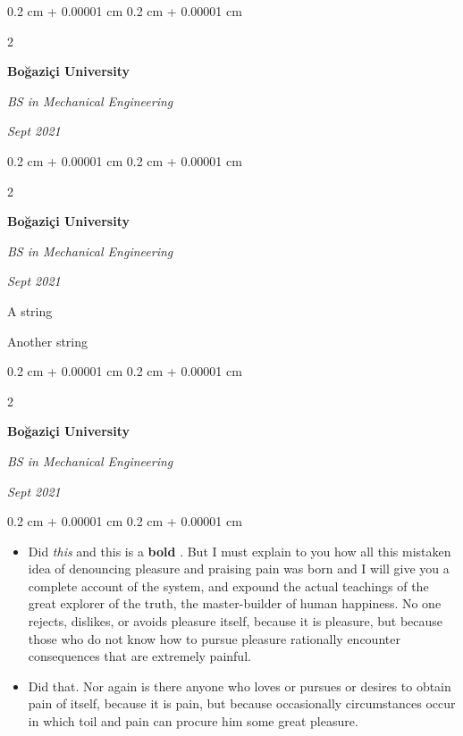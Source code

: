 \documentclass[10pt, letterpaper]{article}
\newenvironment{summary}{
    \begin{description}[
        topsep=0.10 cm,
        parsep=0.10 cm,
        partopsep=0pt,
        itemsep=0pt,
        leftmargin=0.4 cm + 10pt
    ]
}{
    \end{description}
} %
\newenvironment{highlights}{
    \begin{itemize}[
        topsep=0.10 cm,
        parsep=0.10 cm,
        partopsep=0pt,
        itemsep=0pt,
        leftmargin=0.4 cm + 10pt
    ]
}{
    \end{itemize}
} %
\newenvironment{onecolentry}{
    \begin{adjustwidth}{
        0.2 cm + 0.00001 cm
    }{
        0.2 cm + 0.00001 cm
    }
}{
    \end{adjustwidth}
} %
\newenvironment{twocolentry}[2][]{
    \onecolentry
    \def\secondColumn{#2}
    \setcolumnwidth{\fill, 4.5 cm}
    \begin{paracol}{2}
}{
    \switchcolumn \raggedleft \secondColumn
    \end{paracol}
    \endonecolentry
} %
\let\hrefWithoutArrow\href
\renewcommand{\href}[2]{\hrefWithoutArrow{#1}{\ifthenelse{\equal{#2}{}}{ }{#2 }\raisebox{.15ex}{\footnotesize \faExternalLink*}}}
\begin{document}
        \vspace{0.2 cm}

        \begin{twocolentry}{
            
            
        \textit{Sept 2021}}
            \textbf{Boğaziçi University}

            \textit{BS in Mechanical Engineering}
        \end{twocolentry}


        \vspace{0.2 cm}

        \begin{twocolentry}{
            
            
        \textit{Sept 2021}}
            \textbf{Boğaziçi University}

            \textit{BS in Mechanical Engineering}
        \end{twocolentry}
            \begin{summary}
                \item A string
                \item Another string
            \end{summary}


        \vspace{0.2 cm}

        \begin{twocolentry}{
            
            
        \textit{Sept 2021}}
            \textbf{Boğaziçi University}

            \textit{BS in Mechanical Engineering}
        \end{twocolentry}
        \vspace{0.10 cm}
        \begin{onecolentry}
            \begin{highlights}
                \item Did \textit{this} and this is a \textbf{bold} \href{https://example.com}{link}. But I must explain to you how all this mistaken idea of denouncing pleasure and praising pain was born and I will give you a complete account of the system, and expound the actual teachings of the great explorer of the truth, the master-builder of human happiness. No one rejects, dislikes, or avoids pleasure itself, because it is pleasure, but because those who do not know how to pursue pleasure rationally encounter consequences that are extremely painful.
                \item Did that. Nor again is there anyone who loves or pursues or desires to obtain pain of itself, because it is pain, but because occasionally circumstances occur in which toil and pain can procure him some great pleasure.
            \end{highlights}
        \end{onecolentry}
\end{document}
